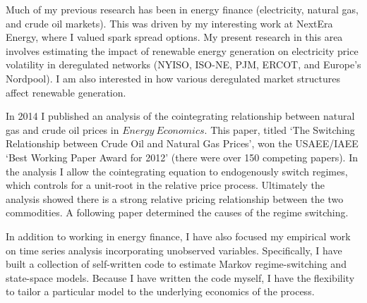 \documentclass[12pt]{article}
\begin{document}
Much of my previous research has been in energy finance (electricity, natural gas, and crude oil markets).  This was driven by my interesting work at NextEra Energy, where I valued spark spread options.  My present research in this area involves estimating the impact of renewable energy generation on electricity price volatility in deregulated networks (NYISO, ISO-NE, PJM, ERCOT, and Europe's Nordpool).  I am also interested in how various deregulated market structures affect renewable generation.

In 2014 I published an analysis of the cointegrating relationship between natural gas and crude oil prices in $Energy\ Economics$.  This paper, titled `The Switching Relationship between Crude Oil and Natural Gas Prices', won the USAEE/IAEE `Best Working Paper Award for 2012' (there were over 150 competing papers).  In the analysis I allow the cointegrating equation to endogenously switch regimes, which controls for a unit-root in the relative price process. Ultimately the analysis showed there is a strong relative pricing relationship between the two commodities.  A following paper determined the causes of the regime switching.

In addition to working in energy finance, I have also focused my empirical work on time series analysis incorporating unobserved variables.  Specifically, I have built a collection of self-written code to estimate Markov regime-switching and state-space models.  Because I have written the code myself, I have the flexibility to tailor a particular model to the underlying economics of the process.  


\end{document}
